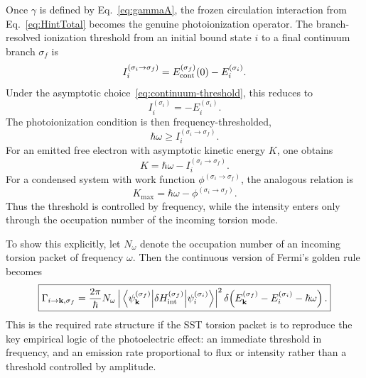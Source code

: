 \documentclass[11pt,a4paper]{article}
\begin{document}
    Once $\gamma$ is defined by Eq.~\eqref{eq:gammaA}, the frozen circulation interaction from Eq.~\eqref{eq:HintTotal} becomes the genuine photoionization operator. The branch-resolved ionization threshold from an initial bound state $i$ to a final continuum branch $\sigma_f$ is
    \begin{equation}
        \label{eq:IonizationThresholdGeneral}
        I_i^{(\sigma_i\to \sigma_f)}
        =
        E_{\rm cont}^{(\sigma_f)}(0)-E_i^{(\sigma_i)}.
    \end{equation}
    Under the asymptotic choice~\eqref{eq:continuum-threshold}, this reduces to
    \begin{equation}
        \label{eq:IonizationThresholdSimple}
        I_i^{(\sigma_i)}=-E_i^{(\sigma_i)}.
    \end{equation}
    The photoionization condition is then frequency-thresholded,
    \begin{equation}
        \label{eq:PhotoThreshold}
        \boxed{
            \hbar\omega \ge I_i^{(\sigma_i\to \sigma_f)}.
        }
    \end{equation}
    For an emitted free electron with asymptotic kinetic energy $K$, one obtains
    \begin{equation}
        \label{eq:KineticEnergyAtom}
        \boxed{
            K
            =
            \hbar\omega - I_i^{(\sigma_i\to \sigma_f)}.
        }
    \end{equation}
    For a condensed system with work function $\phi^{(\sigma_i\to \sigma_f)}$, the analogous relation is
    \begin{equation}
        \label{eq:PhotoelectricSolid}
        \boxed{
            K_{\max}
            =
            \hbar\omega - \phi^{(\sigma_i\to \sigma_f)}.
        }
    \end{equation}
    Thus the threshold is controlled by frequency, while the intensity enters only through the occupation number of the incoming torsion mode.
    
    To show this explicitly, let $N_\omega$ denote the occupation number of an incoming torsion packet of frequency $\omega$. Then the continuous version of Fermi's golden rule \cite{Dirac1927} becomes
    \begin{equation}
        \label{eq:GoldenRuleContinuum}
        \boxed{
            \Gamma_{i\to \mathbf k,\sigma_f}
            =
            \frac{2\pi}{\hbar}
            N_\omega
            \left|
                \matrixel{\psi_{\mathbf k}^{(\sigma_f)}}{\delta H_{\rm int}^{(\sigma_f)}}{\psi_i^{(\sigma_i)}}
            \right|^2
            \delta\!\left(
                        E_{\mathbf k}^{(\sigma_f)}-E_i^{(\sigma_i)}-\hbar\omega
            \right).
        }
    \end{equation}
    This is the required rate structure if the SST torsion packet is to reproduce the key empirical logic of the photoelectric effect: an immediate threshold in frequency, and an emission rate proportional to flux or intensity rather than a threshold controlled by amplitude.
    
\end{document}
